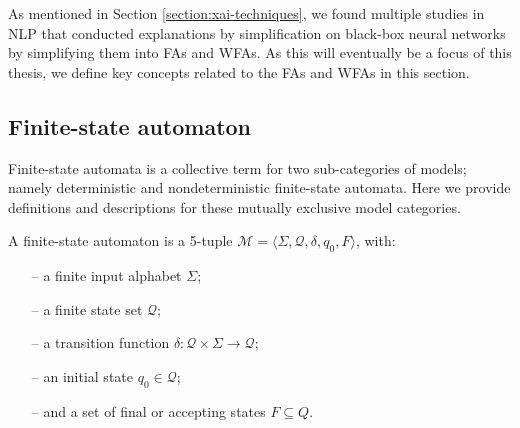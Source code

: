 As mentioned in Section \ref{section:xai-techniques}, we found multiple studies in NLP that conducted explanations by simplification on black-box neural networks by simplifying them into FAs and WFAs. As this will eventually be a focus of this thesis, we define key concepts related to the FAs and WFAs in this section.

\subsection{Finite-state automaton}

Finite-state automata is a collective term for two sub-categories of models; namely deterministic and nondeterministic finite-state automata. Here we provide definitions and descriptions for these mutually exclusive model categories.

\begin{definition}
  \label{def:fsa}
  A finite-state automaton is a 5-tuple $\mathcal{M} = \langle \Sigma, \mathcal{Q}, \delta, q_0, F \rangle$, with:
  \begin{itemize}
    \itemsep0em 
    \item[--] a finite input alphabet $\Sigma$;
    \item[--] a finite state set $\mathcal{Q}$;
    \item[--] a transition function $\delta: \mathcal{Q} \times \Sigma \rightarrow \mathcal{Q}$;
    \item[--] an initial state $q_0 \in \mathcal{Q}$; 
    \item[--] and a set of final or accepting states $F \subseteq Q$.
  \end{itemize}
\end{definition}


